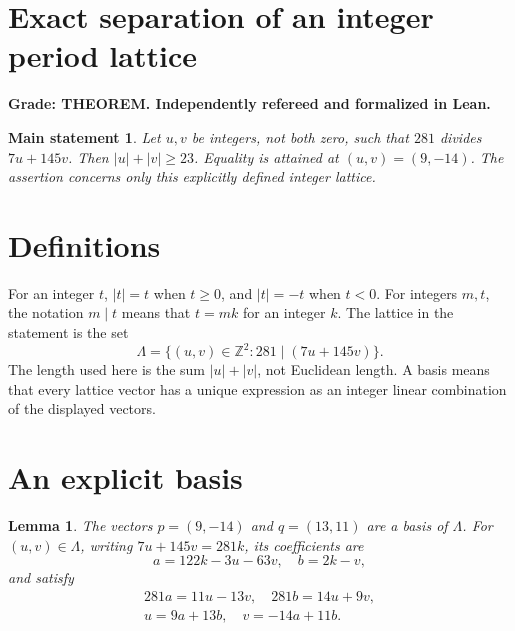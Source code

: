 \documentclass{article}
\newtheorem{lemma}{Lemma}
\newtheorem*{mainstatement}{Main statement}
\begin{document}
\section{Exact separation of an integer period lattice}\label{sec:title}

\textbf{Grade: THEOREM. Independently refereed and formalized in Lean.}

\begin{mainstatement}
  Let \(u, v\) be integers, not both zero, such that \(281\) divides \(7u + 145v\). Then
  \(\lvert u\rvert + \lvert v\rvert \ge 23\). Equality is attained at
  \((u, v) = (9, -14)\). The assertion concerns only this explicitly defined integer
  lattice.
\end{mainstatement}

\section{Definitions}\label{sec:definitions}

For an integer \(t\), \(\lvert t\rvert = t\) when \(t \ge 0\), and \(\lvert t\rvert = -t\)
when \(t < 0\). For integers \(m, t\), the notation \(m \mid t\) means that \(t = mk\) for
an integer \(k\). The lattice in the statement is the set
\begin{equation}
  \Lambda = \{(u, v) \in \mathbb{Z}^2 : 281 \mid (7u + 145v)\}.
\end{equation}
The length used here is the sum \(\lvert u\rvert + \lvert v\rvert\), not Euclidean length.
A basis means that every lattice vector has a unique expression as an integer linear
combination of the displayed vectors.

\section{An explicit basis}\label{sec:basis}

\begin{lemma}\label{lem:basis}
  The vectors \(p = (9, -14)\) and \(q = (13, 11)\) are a basis of \(\Lambda\). For
  \((u, v) \in \Lambda\), writing \(7u + 145v = 281k\), its coefficients are
  \begin{equation}
    a = 122k - 3u - 63v, \quad b = 2k - v,
  \end{equation}
  and satisfy
  \begin{gather}
    281a = 11u - 13v, \quad 281b = 14u + 9v, \\
    u = 9a + 13b, \quad v = -14a + 11b.
  \end{gather}
\end{lemma}
\end{document}
